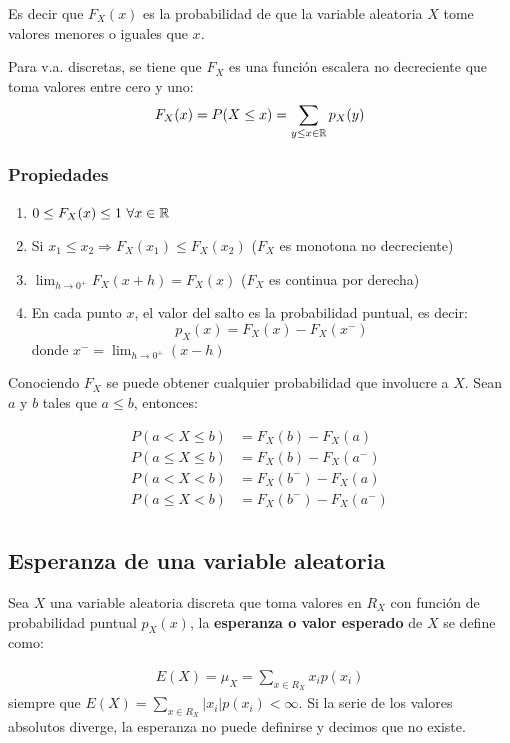 Es decir que $F_X(x)$ es la probabilidad de que la variable aleatoria $X$ tome valores menores o iguales que $x$.

Para v.a. discretas, se tiene que $F_X$ es una función escalera no decreciente que toma valores entre cero y uno:
	\begin{align*}
		F_X(x) = P(X\leq x) = \sum_{y\leq x\in\mathbb{R}} p_X(y)
	\end{align*}
	
	\subsubsection{Propiedades}
	\begin{enumerate}
	\item $0 \leq F_X(x) \leq 1 ~\forall x\in\mathbb{R}$
	\item Si $x_1 \leq x_2 \Rightarrow F_X(x_1) \leq F_X(x_2)$ ($F_X$ es monotona no decreciente)
	\item $\lim_{h\rightarrow 0^+} F_X(x+h) = F_X(x)$ ($F_X$ es continua por derecha)
	\item En cada punto $x$, el valor del salto es la probabilidad puntual, es decir:
	$$p_X(x) = F_X(x) - F_X(x^-)$$
	donde $x^- = \lim_{h\to 0^+} (x-h)$
	\end{enumerate}

Conociendo $F_X$ se puede obtener cualquier probabilidad que involucre a $X$. Sean $a$ y  $b$ tales que $a\leq b$, entonces:
	
\begin{align*}
P(a < X \leq b) &= F_X(b) - F_X(a) \\
P(a \leq X \leq b) &= F_X(b) - F_X(a^-) \\
P(a < X < b) &= F_X(b^-) - F_X(a) \\
P(a \leq X < b) &= F_X(b^-) - F_X(a^-) \\
\end{align*}

\subsection{Esperanza de una variable aleatoria}
	
	Sea $X$ una variable aleatoria discreta que toma valores en $R_X$ con función de probabilidad puntual $p_X(x)$, la\textbf{ esperanza o valor esperado} de $X$ se define como:
	
	\begin{align*}
	E(X) = \mu_X = \sum_{x\in R_X} x_ip(x_i)
	\end{align*}
	siempre que $E(X) = \sum_{x\in R_X} |x_i|p(x_i) < \infty$. Si la serie de los valores absolutos diverge, la esperanza no puede definirse y decimos que no existe.
	
